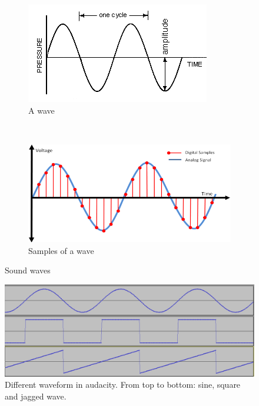 \documentclass[a4paper,12pt]{article}
\begin{document}
\begin{figure}[b]
        \centering
        \begin{subfigure}[b]{0.57\textwidth}
                \centering
                \includegraphics[width=\textwidth]{sinwave}
                \caption{A wave}
                \label{sinwave}
        \end{subfigure}%
        ~ 
        \begin{subfigure}[b]{0.52\textwidth}
                \centering
                \includegraphics[width=\textwidth]{digwave}
                \caption{Samples of a wave}
                \label{digwave}
        \end{subfigure}
    \caption{Sound waves}
   \label{waves}
\end{figure}
\begin{figure}[b]
        \centering
            \includegraphics[width=\textwidth]{waveforms}
            \caption{Different waveform in audacity. From top to bottom: sine, square and jagged wave.}
            \label{waveforms}
\end{figure}
\end{document}
